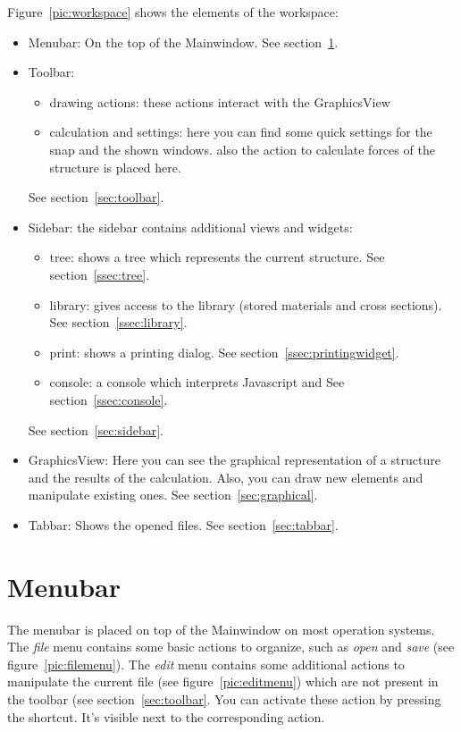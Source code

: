 \documentclass[a4paper,11pt]{report}
\begin{document}
Figure~\ref{pic:workspace} shows the elements of the workspace:
\begin{itemize}
	\item Menubar: On the top of the Mainwindow. See section~\ref{sec:menubar}.
	\item Toolbar: 
	\begin{itemize}
		\item drawing actions: these actions interact with the GraphicsView
		\item calculation and settings: here you can find some quick settings for the snap and the shown windows. also the action to calculate forces of the structure is placed here.
	\end{itemize}
	See section~\ref{sec:toolbar}.
	\item Sidebar: the sidebar contains additional views and widgets:
	\begin{itemize}
		\item tree: shows a tree which represents the current structure. See section~\ref{ssec:tree}.
		\item library: gives access to the library (stored materials and cross sections). See section~\ref{ssec:library}.
		\item print: shows a printing dialog. See section~\ref{ssec:printingwidget}.
		\item console: a console which interprets Javascript and  See section~\ref{ssec:console}.
	\end{itemize}
	See section~\ref{sec:sidebar}.
	\item GraphicsView: Here you can see the graphical representation of a structure and the results of the calculation. Also, you can draw new elements and manipulate existing ones. See section~\ref{sec:graphical}.
	\item Tabbar: Shows the opened files. See section~\ref{sec:tabbar}.
\end{itemize}

\section{Menubar}
\label{sec:menubar}
The menubar is placed on top of the Mainwindow on most operation systems. The \textit{file} menu contains some basic actions to organize, such as \textit{open} and \textit{save} (see figure~\ref{pic:filemenu}). The \textit{edit} menu contains some additional actions to manipulate the current file (see figure~\ref{pic:editmenu}) which are not present in the toolbar (see section~\ref{sec:toolbar}. You can activate these action by pressing the shortcut. It's visible next to the corresponding action.
\end{document}
